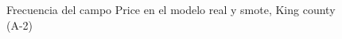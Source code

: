 \begin{figure}[H]
    \centering
    
    \caption{Frecuencia del campo Price en el modelo real y smote, King county (A-2)}
    \label{frecuency-smote-price}
\end{figure}